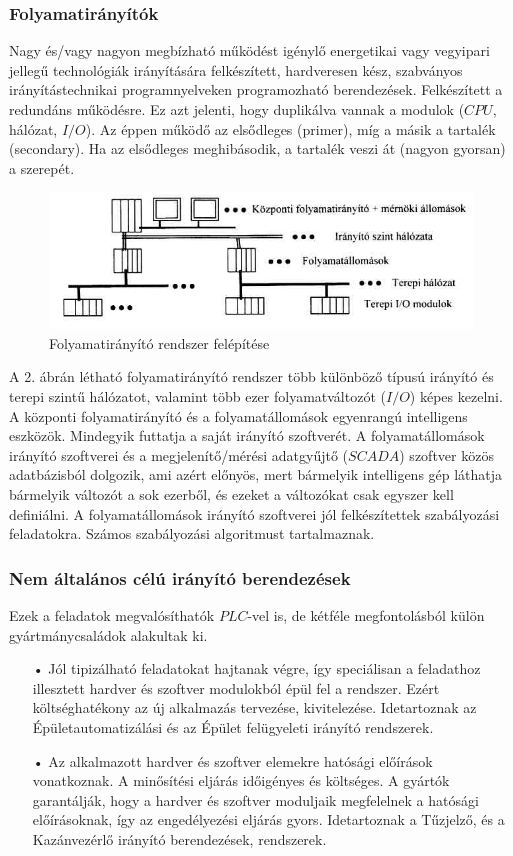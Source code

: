 \documentclass[11pt,a4paper]{article}
\begin{document}
	\subsubsection{Folyamatirányítók}
	Nagy és/vagy nagyon megbízható működést igénylő energetikai vagy vegyipari jellegű technológiák irányítására felkészített, hardveresen kész, szabványos irányítástechnikai programnyelveken programozható berendezések. Felkészített a redundáns működésre. Ez azt jelenti, hogy duplikálva vannak a modulok ($CPU$, hálózat, $I/O$). Az éppen működő az elsődleges (primer), míg a másik a tartalék (secondary). Ha az elsődleges meghibásodik, a tartalék veszi át (nagyon gyorsan) a szerepét.
	\begin{figure}[hbtp]
    	 \centering
		\includegraphics[scale=0.7]{2_folyamati_blokk.png}
		\caption{Folyamatirányító rendszer felépítése}
\end{figure}
A 2. ábrán létható folyamatirányító rendszer több különböző típusú irányító és terepi szintű hálózatot, valamint több ezer folyamatváltozót ($I/O$) képes kezelni. A központi folyamatirányító és a folyamatállomások egyenrangú intelligens eszközök.
Mindegyik futtatja a saját irányító szoftverét.
A folyamatállomások irányító szoftverei és a megjelenítő/mérési adatgyűjtő ($SCADA$) szoftver közös adatbázisból dolgozik, ami azért előnyös, mert bármelyik intelligens gép láthatja bármelyik változót a sok ezerből, és ezeket a  változókat csak egyszer kell definiálni. 
A folyamatállomások irányító szoftverei jól felkészítettek szabályozási feladatokra. Számos szabályozási algoritmust tartalmaznak. 
\subsubsection{Nem általános célú irányító berendezések}
Ezek a feladatok megvalósíthatók $PLC$-vel is, de kétféle megfontolásból külön gyártmánycsaládok alakultak ki.
\begin{enumerate}
	\item[•]Jól tipizálható feladatokat hajtanak végre, így speciálisan a feladathoz illesztett hardver és szoftver modulokból épül fel a rendszer. Ezért költséghatékony az új alkalmazás tervezése, kivitelezése. Idetartoznak az Épületautomatizálási és az Épület felügyeleti irányító rendszerek.
	\item[•] 	Az alkalmazott hardver és szoftver elemekre hatósági előírások vonatkoznak. A minősítési eljárás időigényes és költséges. A gyártók garantálják, hogy a hardver és szoftver moduljaik megfelelnek a hatósági előírásoknak, így az engedélyezési eljárás gyors. Idetartoznak a Tűzjelző, és a Kazánvezérlő irányító berendezések, rendszerek.
\end{enumerate}
\end{document}
